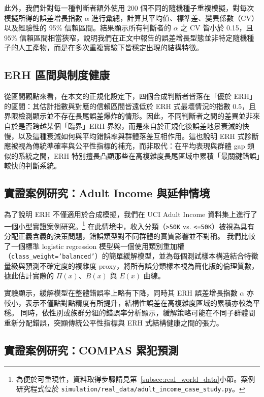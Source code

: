 \documentclass[12pt,a4paper]{article}
\theoremstyle{definition}
\theoremstyle{remark}
\begin{document}
此外，我們針對每一種判斷者額外使用 200 個不同的隨機種子重複模擬，對每次模擬所得的誤差增長指數 $\alpha$ 進行彙總，計算其平均值、標準差、變異係數（CV）以及經驗性的 95\% 信賴區間。結果顯示所有判斷者的 $\alpha$ 之 CV 皆小於 0.15，且 95\% 信賴區間相當狹窄，說明我們在正文中報告的誤差增長型態並非特定隨機種子的人工產物，而是在多次重複實驗下皆穩定出現的結構特徵。

\subsection{ERH 區間與制度健康}

從區間觀點來看，在本文的正規化設定下，四個合成判斷者皆落在「優於 ERH」的區間：其估計指數與對應的信賴區間皆遠低於 ERH 式最壞情況的指數 $0.5$，且界限檢測顯示並不存在長尾誤差爆炸的情形。因此，不同判斷者之間的差異並非來自於是否跨越某個「臨界」ERH 界線，而是來自於正規化後誤差地景衰減的快慢，以及這種衰減如何與平均錯誤率與群體落差互相作用。這也說明 ERH 式診斷應被視為傳統準確率與公平性指標的補充，而非取代：在平均表現與群體 gap 類似的系統之間，ERH 特別擅長凸顯那些在高複雜度長尾區域中累積「最關鍵錯誤」較快的判斷系統。

\subsection{實證案例研究：Adult Income 與延伸情境}

為了說明 ERH 不僅適用於合成模擬，我們在 UCI Adult Income 資料集上進行了一個小型實證案例研究。\footnote{為便於可重現性，資料取得步驟請見第~\ref{subsec:real_world_data}小節。案例研究程式位於 \texttt{simulation/real\_data/adult\_income\_case\_study.py}。}
在此情境中，收入分類（\texttt{>50K} vs. \texttt{\textless=50K}）被視為具有分配正義含義的決策問題，錯誤類型對不同群體的實質影響並不對稱。
我們比較了一個標準 logistic regression 模型與一個使用類別重加權（\texttt{class\_weight='balanced'}）的簡單緩解模型，並為每個測試樣本構造結合特徵量級與預測不確定度的複雜度 proxy，將所有誤分類樣本視為簡化版的倫理質數，據此估計實際的 $\Pi(x)$、$B(x)$ 與 $E(x)$ 曲線。

實驗顯示，緩解模型在整體錯誤率上略有下降，同時其 ERH 誤差增長指數 $\alpha$ 亦較小，表示不僅點對點精度有所提升，結構性誤差在高複雜度區域的累積亦較為平穩。
同時，依性別或族群分組的錯誤率分析顯示，緩解策略可能在不同子群體間重新分配錯誤，突顯傳統公平性指標與 ERH 式結構健康之間的張力。

\subsection{實證案例研究：COMPAS 累犯預測}
\label{subsec:compas_zh}
\end{document}
